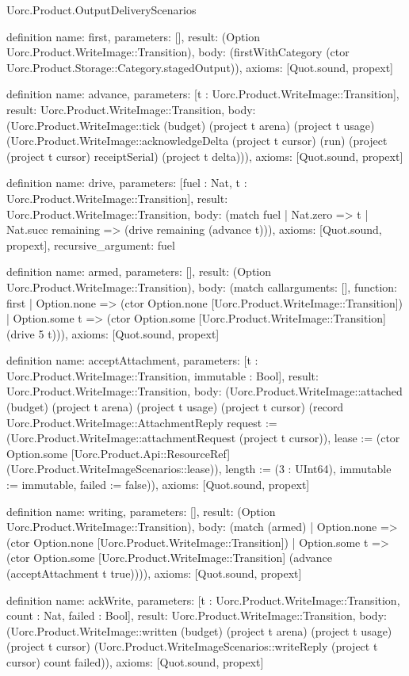 \begin{lexlean}{Uorc.Product.OutputDeliveryScenarios}
\begin{semanticmodule}
definition{
  name: first,
  parameters: [],
  result: (Option Uorc.Product.WriteImage::Transition),
  body: (firstWithCategory (ctor Uorc.Product.Storage::Category.stagedOutput)),
  axioms: [Quot.sound, propext]
}

definition{
  name: advance,
  parameters: [t : Uorc.Product.WriteImage::Transition],
  result: Uorc.Product.WriteImage::Transition,
  body: (Uorc.Product.WriteImage::tick (budget) (project t arena) (project t usage) (Uorc.Product.WriteImage::acknowledgeDelta (project t cursor) (run) (project (project t cursor) receiptSerial) (project t delta))),
  axioms: [Quot.sound, propext]
}

definition{
  name: drive,
  parameters: [fuel : Nat, t : Uorc.Product.WriteImage::Transition],
  result: Uorc.Product.WriteImage::Transition,
  body: (match fuel | Nat.zero => t | Nat.succ remaining => (drive remaining (advance t))),
  axioms: [Quot.sound, propext],
  recursive_argument: fuel
}

definition{
  name: armed,
  parameters: [],
  result: (Option Uorc.Product.WriteImage::Transition),
  body: (match call{arguments: [], function: first}
    | Option.none => (ctor Option.none [Uorc.Product.WriteImage::Transition])
    | Option.some t => (ctor Option.some [Uorc.Product.WriteImage::Transition] (drive 5 t))),
  axioms: [Quot.sound, propext]
}

definition{
  name: acceptAttachment,
  parameters: [t : Uorc.Product.WriteImage::Transition, immutable : Bool],
  result: Uorc.Product.WriteImage::Transition,
  body: (Uorc.Product.WriteImage::attached (budget) (project t arena) (project t usage) (project t cursor) (record Uorc.Product.WriteImage::AttachmentReply {request := (Uorc.Product.WriteImage::attachmentRequest (project t cursor)), lease := (ctor Option.some [Uorc.Product.Api::ResourceRef] (Uorc.Product.WriteImageScenarios::lease)), length := (3 : UInt64), immutable := immutable, failed := false})),
  axioms: [Quot.sound, propext]
}

definition{
  name: writing,
  parameters: [],
  result: (Option Uorc.Product.WriteImage::Transition),
  body: (match (armed)
    | Option.none => (ctor Option.none [Uorc.Product.WriteImage::Transition])
    | Option.some t => (ctor Option.some [Uorc.Product.WriteImage::Transition] (advance (acceptAttachment t true)))),
  axioms: [Quot.sound, propext]
}

definition{
  name: ackWrite,
  parameters: [t : Uorc.Product.WriteImage::Transition, count : Nat, failed : Bool],
  result: Uorc.Product.WriteImage::Transition,
  body: (Uorc.Product.WriteImage::written (budget) (project t arena) (project t usage) (project t cursor) (Uorc.Product.WriteImageScenarios::writeReply (project t cursor) count failed)),
  axioms: [Quot.sound, propext]
}


\end{semanticmodule}
\end{lexlean}
